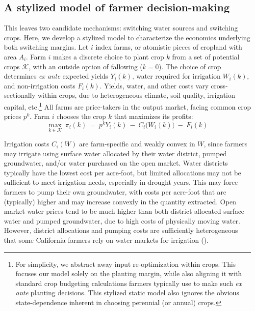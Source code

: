 \subsection{A stylized model of farmer decision-making}
\label{sec:farmmodel}
This leaves two candidate mechanisms: switching water sources and switching crops. Here, we develop a stylized model to characterize the economics underlying both switching margins. Let $i$ index farms, or atomistic pieces of cropland with area $A_i$. Farm $i$ makes a discrete choice to plant crop $k$ from a set of potential crops $\mathcal K$, with an outside option of fallowing ($k=0$). The choice of crop determines \emph{ex ante} expected yields $Y_i(k)$, water required for irrigation $W_i(k)$, and  non-irrigation costs $F_i(k)$. Yields, water, and other costs vary cross-sectionally within crops, due to  heterogeneous climate, soil quality, irrigation capital, etc.\footnote{
For simplicity, we abstract away input re-optimization within crops. This focuses our model solely on the planting margin, while also aligning it with standard crop budgeting calculations farmers typically use to make such \emph{ex ante} planting decisions. This stylized static model also ignores the obvious state-dependence inherent in choosing perennial (or annual) crops.
}
All farms are price-takers in the output market, facing common crop prices $p^k$. Farm $i$ chooses the crop $k$ that maximizes its profits:
\begin{equation}
\max_{k \in \mathcal K} 	~\pi_i(k) ~=~ p^k Y_i(k) ~-~C_i\big(W_i(k)\big) ~-~ F_i(k) \label{eq:profit_max_choice} 
\end{equation}


Irrigation costs $C_i(W)$ are farm-specific and weakly convex in $W$, since farmers may irrigate using surface water allocated by their water district, pumped groundwater, and/or water purchased on the open market. Water districts typically have the lowest cost per acre-foot, but limited allocations may not be sufficient to meet irrigation needs, especially in drought years. This may force farmers to pump their own groundwater, with costs per acre-foot that are (typically) higher and may increase convexly in the quantity extracted. Open market water prices tend to be much higher than both district-allocated surface water and pumped groundwater, due to high costs of physically moving water. However, district allocations and pumping costs are sufficiently heterogeneous that some California farmers rely on water markets for irrigation (\textcite{hagerty2018}). 

